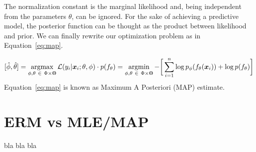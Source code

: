 The normalization constant is the marginal likelihood and, being independent from the parameters $\theta$, can be ignored. For the sake of achieving a predictive model, the posterior function can be thought as the product between likelihood and prior. We can finally rewrite our optimization problem as in Equation~\eqref{eq:map}.

\begin{equation} \label{eq:map}
	[\hat \phi, \hat \theta] = \mathop{\mathrm{argmax}}\limits_{\phi, \theta~\in~\Phi \times \Theta}\mathcal{L}(y_i|\bm{x}_i; \theta, \phi) \cdot p(f_\theta) =
	\mathop{\mathrm{argmin}}\limits_{\phi, \theta~\in~\Phi \times \Theta} -\bigg[\sum_{i=1}^n \log p_\phi(f_\theta(\bm{x}_i))  + \log p(f_\theta)\bigg]
\end{equation}
Equation~\eqref{eq:map} is known as Maximum A Posteriori (MAP) estimate.





\section{ERM vs MLE/MAP} \label{sec:erm-mlemap_connection}
bla bla bla
